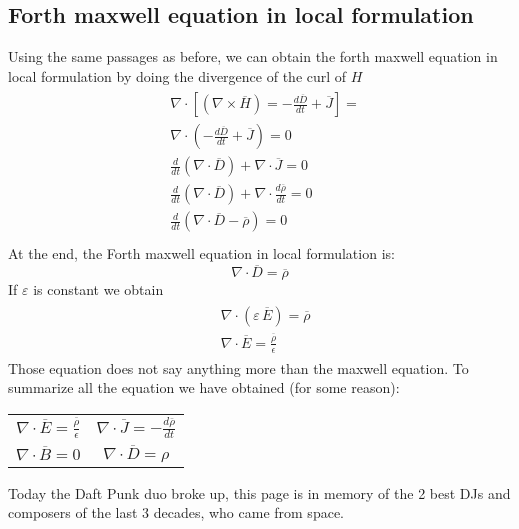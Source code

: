 \subsection*{Forth maxwell equation in local formulation}
Using the same passages as before, we can obtain the forth maxwell equation in local formulation by doing the divergence of the curl of $H$
\begin{align}
    \begin{split}
        &\nabla \cdot \left[ (\nabla\times \overline{H})=-\frac{d\overline{D}}{dt}+\overline{J}\right]=\\[5pt]
        &\nabla \cdot \left(-\frac{d\overline{D}}{dt}+\overline{J}\right)=0\\[5pt]
        &\frac{d}{dt}(\nabla\cdot \overline{D})+\nabla\cdot \overline{J}=0\\[5pt]
        &\frac{d}{dt}(\nabla\cdot \overline{D})+\nabla\cdot \frac{d\overline\rho}{dt}=0\\[5pt]
        &\frac{d}{dt}\left(\nabla\cdot\overline{D}-\overline{\rho}\right)=0\\[5pt]
    \end{split}
\end{align}
At the end, the Forth maxwell equation in local formulation is:
\begin{equation}
    \nabla\cdot\overline{D}=\overline{\rho}
\end{equation}
If $\varepsilon$ is constant we obtain
\begin{align}
    \begin{split}
        &\nabla\cdot(\varepsilon\,\overline{E})=\overline{\rho}\\[5pt]
        &\nabla\cdot\overline{E}=\frac{\overline{\rho}}{\epsilon}
    \end{split}
\end{align}
Those equation does not say anything more than the maxwell equation.
To summarize all the equation we have obtained (for some reason):
\begin{center}
\begin{tabular}{ c c }
    $\nabla\cdot\overline{E}=\frac{\overline{\rho}}{\epsilon}$&$\nabla\cdot\overline{J}=-\frac{d\overline{\rho}}{dt}$\\[5pt]
    $\nabla\cdot\overline{B}=0$&$\nabla\cdot\overline{D}=\rho$
\end{tabular}
\end{center}
\vspace*{\fill}
Today the Daft Punk duo broke up, this page is in memory of the 2 best DJs and composers of the last 3 decades, who came from space.